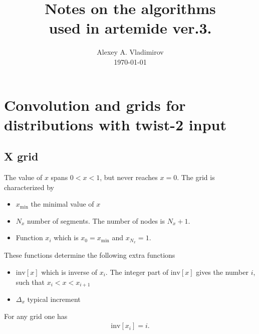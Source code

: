 \documentclass[prd,nofootinbib,eqsecnum,final]{revtex4}
\renewcommand{\(}{\left(}
\renewcommand{\)}{\right)}
\renewcommand{\[}{\left[}
\renewcommand{\]}{\right]}
\begin{document}
\title{Notes on the algorithms\\ used in artemide ver.3.}
\author{Alexey A. Vladimirov \\ \today}
\noaffiliation

\maketitle

\section{Convolution and grids for distributions with twist-2 input}

\subsection{X grid}

The value of $x$ spans $0<x<1$, but never reaches $x=0$. The grid is characterized by
\begin{itemize}
\item $x_{\text{min}}$ the minimal value of $x$
\item $N_x$ number of segments. The number of nodes is $N_x+1$.
\item Function $x_i$ which is $x_0=x_{\text{min}}$ and $x_{N_x}=1$.
\end{itemize}
These functions determine the following extra functions
\begin{itemize}
\item $\text{inv}[x]$ which is inverse of $x_i$. The integer part of $\text{inv}[x]$ gives the number $i$, such that $x_{i}<x<x_{i+1}$
\item $\Delta_x$ typical increment
\end{itemize}
For any grid one has
\begin{eqnarray}
\text{inv}[x_{i}]=i.
\end{eqnarray}
\end{document}
